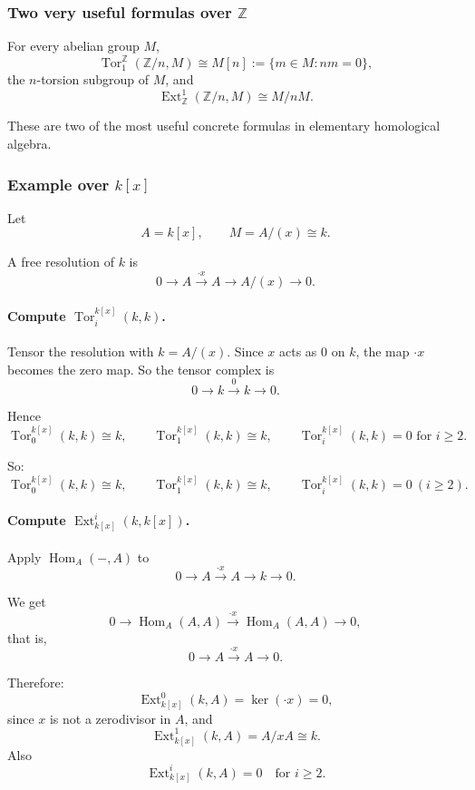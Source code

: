 \documentclass[12pt,a4paper]{article}
\theoremstyle{notespace}
\DeclareMathOperator{\Hom}{Hom}
\DeclareMathOperator{\Tor}{Tor}
\DeclareMathOperator{\Ext}{Ext}
\begin{document}
\subsubsection{Two very useful formulas over \(\mathbb Z\)}

For every abelian group \(M\),
\[
\Tor_1^\mathbb Z(\mathbb Z/n,M)\cong M[n]
:=\{m\in M: nm=0\},
\]
the \(n\)-torsion subgroup of \(M\), and
\[
\Ext_\mathbb Z^1(\mathbb Z/n,M)\cong M/nM.
\]

These are two of the most useful concrete formulas in elementary homological algebra.

\subsubsection{Example over \(k[x]\)}

Let
\[
A=k[x],
\qquad
M=A/(x)\cong k.
\]

A free resolution of \(k\) is
\[
0\longrightarrow A \xrightarrow{\cdot x} A \longrightarrow A/(x)\longrightarrow 0.
\]

\paragraph{Compute \(\Tor_i^{k[x]}(k,k)\).}

Tensor the resolution with \(k=A/(x)\). Since \(x\) acts as \(0\) on \(k\), the map \(\cdot x\) becomes the zero map. So the tensor complex is
\[
0\longrightarrow k \xrightarrow{0} k \longrightarrow 0.
\]

Hence
\[
\Tor_0^{k[x]}(k,k)\cong k,
\qquad
\Tor_1^{k[x]}(k,k)\cong k,
\qquad
\Tor_i^{k[x]}(k,k)=0 \text{ for } i\ge 2.
\]

So:
\[
\boxed{
	\Tor_0^{k[x]}(k,k)\cong k,\qquad
	\Tor_1^{k[x]}(k,k)\cong k,\qquad
	\Tor_i^{k[x]}(k,k)=0 \ (i\ge 2).
}
\]

\paragraph{Compute \(\Ext_{k[x]}^i(k,k[x])\).}

Apply \(\Hom_A(-,A)\) to
\[
0\longrightarrow A \xrightarrow{\cdot x} A \longrightarrow k \longrightarrow 0.
\]

We get
\[
0\longrightarrow \Hom_A(A,A)\xrightarrow{\cdot x}\Hom_A(A,A)\longrightarrow 0,
\]
that is,
\[
0\longrightarrow A \xrightarrow{\cdot x} A \longrightarrow 0.
\]

Therefore:
\[
\Ext_{k[x]}^0(k,A)=\ker(\cdot x)=0,
\]
since \(x\) is not a zerodivisor in \(A\), and
\[
\Ext_{k[x]}^1(k,A)=A/xA\cong k.
\]
Also
\[
\Ext_{k[x]}^i(k,A)=0 \quad \text{for } i\ge 2.
\]
\end{document}
